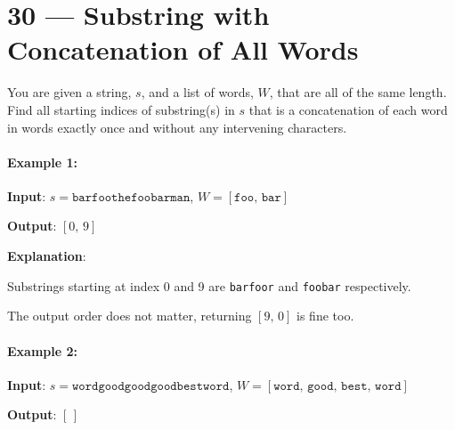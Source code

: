 \section{30 --- Substring with Concatenation of All Words}
You are given a string, $s$, and a list of words, $W$, that are all of the same length. Find all starting indices of substring(s) in $s$ that is a concatenation of each word in words exactly once and without any intervening characters.

\paragraph{Example 1:}

\begin{flushleft}
\textbf{Input}: $s = \texttt{barfoothefoobarman}$, $W = [\texttt{foo},\, \texttt{bar}]$

\textbf{Output}: $[0,\,9]$

\textbf{Explanation}: 

Substrings starting at index 0 and 9 are \texttt{barfoor} and \texttt{foobar} respectively. 

The output order does not matter, returning $[9,\,0]$ is fine too.
\end{flushleft}

\paragraph{Example 2:}

\begin{flushleft}
\textbf{Input}: $s = \texttt{wordgoodgoodgoodbestword}$, $W = [\texttt{word},\,\texttt{good},\,\texttt{best},\,\texttt{word}]$

\textbf{Output}: $[\,]$
\end{flushleft}